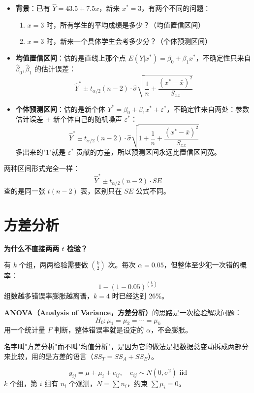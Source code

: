 \begin{itemize}
  \item \textbf{背景}：已有 $\hat{Y} = 43.5 + 7.5x$，新来 $x^* = 3$，有两个不同的问题：
  \begin{enumerate}
    \item $x=3$ 时，所有学生的平均成绩是多少？（均值置信区间）
    \item $x=3$ 时，新来一个具体学生会考多少分？（个体预测区间）
  \end{enumerate}

  \item \textbf{均值置信区间}：估的是直线上那个点 $E(Y|x^*) = \beta_0 + \beta_1 x^*$，不确定性只来自 $\hat{\beta}_0, \hat{\beta}_1$ 的估计误差：
  \[
  \hat{Y}^* \pm t_{\alpha/2}(n-2) \cdot \hat{\sigma}\sqrt{\frac{1}{n} + \frac{(x^*-\bar{x})^2}{S_{xx}}}
  \]

  \item \textbf{个体预测区间}：估的是新个体 $Y^* = \beta_0 + \beta_1 x^* + \varepsilon^*$，不确定性来自两处：参数估计误差 $+$ 新个体自己的随机噪声 $\varepsilon^*$：
  \[
  \hat{Y}^* \pm t_{\alpha/2}(n-2) \cdot \hat{\sigma}\sqrt{1 + \frac{1}{n} + \frac{(x^*-\bar{x})^2}{S_{xx}}}
  \]
  多出来的"$1$"就是 $\varepsilon^*$ 贡献的方差，所以预测区间永远比置信区间宽。
\end{itemize}
\begin{note}
两种区间形式完全一样：
\[
\hat{Y}^* \pm t_{\alpha/2}(n-2) \cdot SE
\]
查的是同一张 $t(n-2)$ 表，区别只在 $SE$ 公式不同。
\end{note}
\section{方差分析}
\begin{note}
\textbf{为什么不直接两两 $t$ 检验？}

有 $k$ 个组，两两检验需要做 $\binom{k}{2}$ 次。每次 $\alpha = 0.05$，但整体至少犯一次错的概率：
\[
1 - (1-0.05)^{\binom{k}{2}}
\]
组数越多错误率膨胀越离谱，$k=4$ 时已经达到 $26\%$。

\textbf{ANOVA（Analysis of Variance，方差分析）}的思路是一次检验解决问题：
\[
H_0: \mu_1 = \mu_2 = \cdots = \mu_k
\]
用一个统计量 $F$ 判断，整体错误率就是设定的 $\alpha$，不会膨胀。

名字叫"方差分析"而不叫"均值分析"，是因为它的做法是把数据总变动拆成两部分来比较，用的是方差的语言（$SS_T = SS_A + SS_E$）。
\end{note}
\begin{definition}[单因子方差分析模型]
\[
y_{ij} = \mu + \mu_i + e_{ij}, \quad e_{ij} \sim N(0, \sigma^2) \text{ iid}
\]
$k$ 个组，第 $i$ 组有 $n_i$ 个观测，$N = \sum n_i$，约束 $\sum \mu_i = 0$。
\end{definition}

